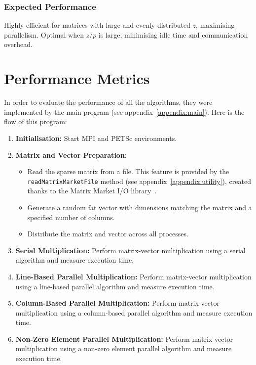 \documentclass[12pt,oneside]{book} %
\begin{document}
\subsubsection{Expected Performance}
Highly efficient for matrices with large and evenly distributed $z$, maximising
parallelism. Optimal when $z/p$ is large, minimising idle time and
communication overhead.

\newpage
\section{Performance Metrics}
In order to evaluate the performance of all the algorithms, they were
implemented by the main program (see appendix~\ref{appendix:main}). Here is the
flow of this program:

\begin{enumerate}
    \item \textbf{Initialisation:} Start MPI and PETSc environments.
    \item \textbf{Matrix and Vector Preparation:}
          \begin{itemize}
              \item Read the sparse matrix from a file. This feature is provided by the
                    \texttt{readMatrixMarketFile} method (see appendix~\ref{appendix:utility}),
                    created thanks to the Matrix Market I/O
                    library~\cite{Lugowski2023FastMatrixMarket}.
              \item Generate a random fat vector with dimensions matching the matrix and a
                    specified number of columns.
              \item Distribute the matrix and vector across all processes.
          \end{itemize}
    \item \textbf{Serial Multiplication:} Perform matrix-vector multiplication using a serial algorithm and measure execution time.
    \item \textbf{Line-Based Parallel Multiplication:} Perform matrix-vector multiplication using a line-based parallel algorithm and measure execution time.
    \item \textbf{Column-Based Parallel Multiplication:} Perform matrix-vector multiplication using a column-based parallel algorithm and measure execution time.
    \item \textbf{Non-Zero Element Parallel Multiplication:} Perform matrix-vector multiplication using a non-zero element parallel algorithm and measure execution time.

\end{enumerate}
\end{document}
